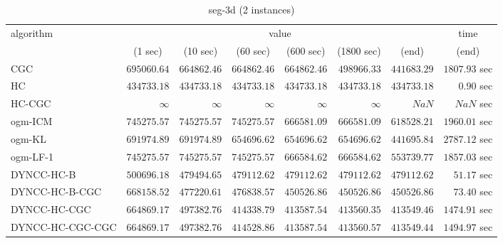 \begin{table}[H]
\tiny
\centering
\caption{seg-3d (2 instances)}
\label{tab:anytimetable-seg-3d}
\begin{tabular}{lrrrrrrr}
\toprule
           algorithm &                                   \multicolumn{6}{c}{value} & \multicolumn{1}{c}{time}   \\  
\cmidrule(lr){2-7}\cmidrule(lr){8-8}  
                     & \multicolumn{1}{c}{(1 sec)} & \multicolumn{1}{c}{(10 sec)} & \multicolumn{1}{c}{(60 sec)} & \multicolumn{1}{c}{(600 sec)} & \multicolumn{1}{c}{(1800 sec)} & \multicolumn{1}{c}{(end)} & \multicolumn{1}{c}{(end)}   \\ \midrule 
                 CGC & $    695060.64$ & $    664862.46$ & $    664862.46$ & $    664862.46$ & $    498966.33$ & $    441683.29$ & $      1807.93$ sec   \\ 
                  HC & $    434733.18$ & $    434733.18$ & $    434733.18$ & $    434733.18$ & $    434733.18$ & $    434733.18$ & $         0.90$ sec   \\ 
              HC-CGC & $\infty$ & $\infty$ & $\infty$ & $\infty$ & $\infty$ & $          NaN$ & $          NaN$ sec   \\ 
             ogm-ICM & $    745275.57$ & $    745275.57$ & $    745275.57$ & $    666581.09$ & $    666581.09$ & $    618528.21$ & $      1960.01$ sec   \\ 
              ogm-KL & $    691974.89$ & $    691974.89$ & $    654696.62$ & $    654696.62$ & $    654696.62$ & $    441695.84$ & $      2787.12$ sec   \\ 
            ogm-LF-1 & $    745275.57$ & $    745275.57$ & $    745275.57$ & $    666584.62$ & $    666584.62$ & $    553739.77$ & $      1857.03$ sec   \\ 
          DYNCC-HC-B & $    500696.18$ & $    479494.65$ & $    479112.62$ & $    479112.62$ & $    479112.62$ & $    479112.62$ & $        51.17$ sec   \\ 
      DYNCC-HC-B-CGC & $    668158.52$ & $    477220.61$ & $    476838.57$ & $    450526.86$ & $    450526.86$ & $    450526.86$ & $        73.40$ sec   \\ 
        DYNCC-HC-CGC & $    664869.17$ & $    497382.76$ & $    414338.79$ & $    413587.54$ & $    413560.35$ & $    413549.46$ & $      1474.91$ sec   \\ 
    DYNCC-HC-CGC-CGC & $    664869.17$ & $    497382.76$ & $    414528.86$ & $    413587.54$ & $    413560.57$ & $    413549.44$ & $      1494.97$ sec   \\ 

\end{tabular}
\end{table}
